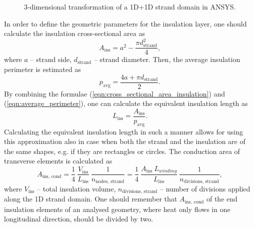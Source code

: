 \begin{figure}[H]
    \caption{3-dimensional transformation of a 1D+1D strand domain in ANSYS.}
    \label{fig: 1d_strand_geometry_with_insulation}
\end{figure}

In order to define the geometric parameters for the insulation layer, one should calculate the insulation cross-sectional area as
\begin{equation}
    A_\text{ins} = a^2 - \frac{\pi d_\text{strand}^2}{4}, 
    \label{eqn:cross_sectional_area_insulation}
\end{equation}
where $a$ -- strand side, $d_\text{strand}$ -- strand diameter. Then, the average insulation perimeter is estimated as
\begin{equation}
    p_\text{avg} = \frac{4 a + \pi d_\text{strand}}{2}.
    \label{eqn:average_perimeter}
\end{equation}
By combining the formulae (\ref{eqn:cross_sectional_area_insulation}) and (\ref{eqn:average_perimeter}), one can calculate the equivalent insulation length as 
\begin{equation}
    L_\text{ins} = \frac{A_\text{ins}}{p_\text{avg}}.
    \label{eqn:equivalent_insulation_length}
\end{equation}
Calculating the equivalent insulation length in such a manner allows for using this approximation also in case when both the strand and the insulation are of the same shapes, e.g. if they are rectangles or circles. The conduction area of transverse elements is calculated as
\begin{equation}
    A_\text{ins, cond} = \frac{1}{4}~\frac{ V_\text{ins}}{L_\text{ins}}~\frac{1}{n_\text{nodes, strand}}= \frac{1}{4}~\frac{ A_\text{ins} ~ L_{winding}}{L_\text{ins}}~\frac{1}{n_\text{divisions, strand}},
    \label{eqn:equivalent_insulation_element_area}
\end{equation}
where $V_\text{ins}$ -- total insulation volume, $n_\text{divisions, strand}$ -- number of divisions applied along the 1D strand domain. One should remember that $A_\text{ins, cond}$ of the end insulation elements of an analysed geometry, where heat only flows in one longitudinal direction, should be divided by two.

